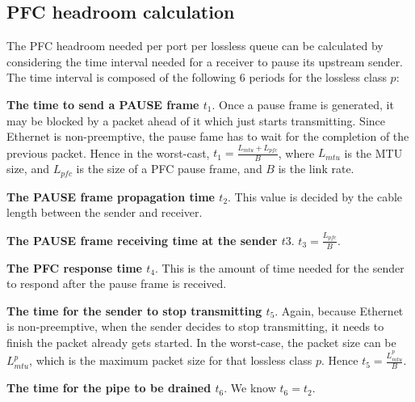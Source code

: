 \begin{appendices}
\section{PFC headroom calculation}\label{APPHEADROOM}

The PFC headroom needed per port per lossless queue can be calculated by considering the time interval needed for a receiver to pause its upstream sender. The time interval is composed of the following 6 periods for the lossless class $p$:

	
\noindent\textbf{The time to send a PAUSE frame $t_1$}.
Once a pause frame is generated, it may be blocked by a packet ahead of it which just starts transmitting. Since Ethernet is non-preemptive, the pause fame has to wait for the completion of the previous packet. Hence in the worst-cast, $t_1 = \frac{ L_{mtu} + L_{pfc}}{B}$, where $L_{mtu}$ is the MTU size, and $L_{pfc}$ is the size of a PFC pause frame, and $B$ is the link rate.


\noindent\textbf{The PAUSE frame propagation time $t_2$}. This value is decided by the cable length between the sender and receiver.

\noindent\textbf{The PAUSE frame receiving time at the sender $t3$}. $t_3=\frac{L_{pfc}}{B}$.

\noindent\textbf{The PFC response time $t_4$}. This is the amount of time needed for the sender to respond after the pause frame is received.

\noindent\textbf{The time for the sender to stop transmitting $t_5$}. Again, because Ethernet is non-preemptive, when the sender decides to stop transmitting, it needs to finish the packet already gets started. In the worst-case, the packet size can be $L^{p}_{mtu}$, which is the maximum packet size for that lossless class $p$. Hence $t_5 = \frac{L^{p}_{mtu}}{B}$.

\noindent\textbf{The time for the pipe to be drained $t_6$}. We know $t_6 = t_2$.



\end{appendices}
